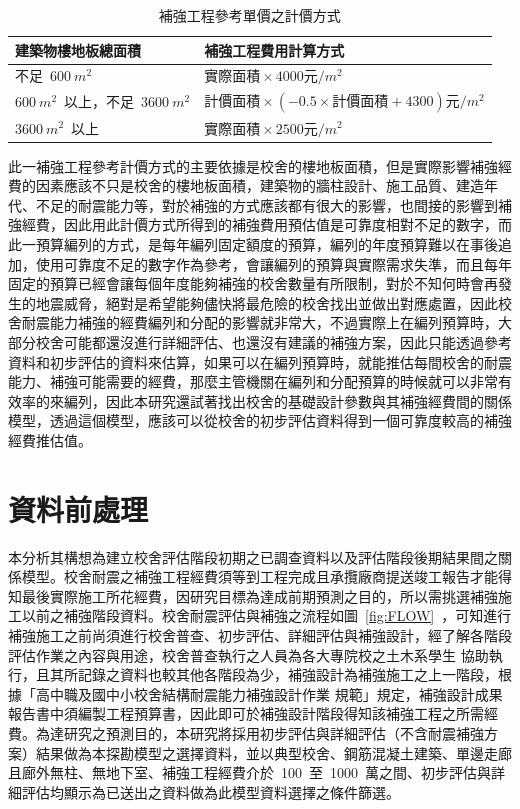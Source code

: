 \setlength{\tabcolsep}{1em}
{\renewcommand{\arraystretch}{1.5}
\begin{table}[hbtp]
  \begin{center}
    \caption{補強工程參考單價之計價方式}
    \label{tab:cost_result_table}
    \begin{tabular}{l l}
      \hline
      建築物樓地板總面積 & 補強工程費用計算方式 \\
      \hline
      不足~$600~m^2$ & $\text{實際面積} \times 4000 \text{元}/m^2$ \\
      $600~m^2$~以上，不足~$3600~m^2$ & $\text{計價面積} \times (-0.5 \times \text{計價面積} + 4300) \text{元}/m^2$ \\
      $3600~m^2$~以上 & $\text{實際面積} \times 2500 \text{元}/m^2$ \\
      \hline
      \end{tabular}
  \end{center}
\end{table}
}

此一補強工程參考計價方式的主要依據是校舍的樓地板面積，但是實際影響補強經費的因素應該不只是校舍的樓地板面積，建築物的牆柱設計、施工品質、建造年代、不足的耐震能力等，對於補強的方式應該都有很大的影響，也間接的影響到補強經費，因此用此計價方式所得到的補強費用預估值是可靠度相對不足的數字，而此一預算編列的方式，是每年編列固定額度的預算，編列的年度預算難以在事後追加，使用可靠度不足的數字作為參考，會讓編列的預算與實際需求失準，而且每年固定的預算已經會讓每個年度能夠補強的校舍數量有所限制，對於不知何時會再發生的地震威脅，絕對是希望能夠儘快將最危險的校舍找出並做出對應處置，因此校舍耐震能力補強的經費編列和分配的影響就非常大，不過實際上在編列預算時，大部分校舍可能都還沒進行詳細評估、也還沒有建議的補強方案，因此只能透過參考資料和初步評估的資料來估算，如果可以在編列預算時，就能推估每間校舍的耐震能力、補強可能需要的經費，那麼主管機關在編列和分配預算的時候就可以非常有效率的來編列，因此本研究還試著找出校舍的基礎設計參數與其補強經費間的關係模型，透過這個模型，應該可以從校舍的初步評估資料得到一個可靠度較高的補強經費推估值。


\section{資料前處理}

本分析其構想為建立校舍評估階段初期之已調查資料以及評估階段後期結果間之關係模型。校舍耐震之補強工程經費須等到工程完成且承攬廠商提送竣工報告才能得知最後實際施工所花經費，因研究目標為達成前期預測之目的，所以需挑選補強施工以前之補強階段資料。校舍耐震評估與補強之流程如圖~\ref{fig:FLOW}~，可知進行補強施工之前尚須進行校舍普查、初步評估、詳細評估與補強設計，經了解各階段評估作業之內容與用途，校舍普查執行之人員為各大專院校之土木系學生 協助執行，且其所記錄之資料也較其他各階段為少，補強設計為補強施工之上一階段，根據「高中職及國中小校舍結構耐震能力補強設計作業 規範」規定，補強設計成果報告書中須編製工程預算書，因此即可於補強設計階段得知該補強工程之所需經費。為達研究之預測目的，本研究將採用初步評估與詳細評估（不含耐震補強方案）結果做為本探勘模型之選擇資料，並以典型校舍、鋼筋混凝土建築、單邊走廊且廊外無柱、無地下室、補強工程經費介於~100~至~1000~萬之間、初步評估與詳細評估均顯示為已送出之資料做為此模型資料選擇之條件篩選。

